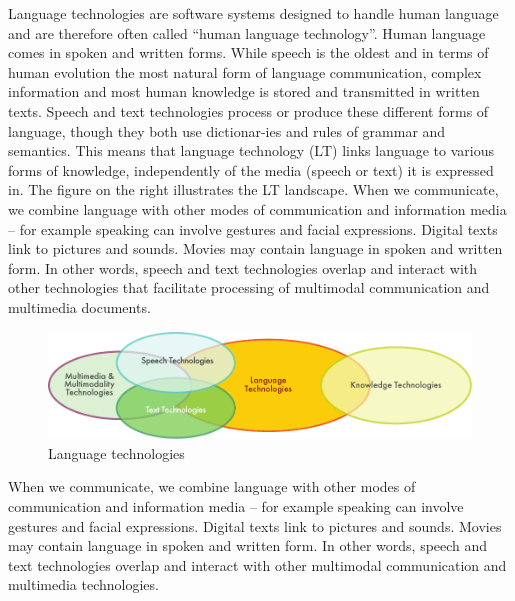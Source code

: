 \clearpage


\begin{multicols}{2}

Language technologies are software systems designed to handle human language and are therefore often called “human language technology”. Human language comes in spoken and written forms. While speech is the oldest and in terms of human evolution the most natural form of language communication, complex information and most human knowledge is stored and transmitted in written texts. Speech and text technologies process or produce these different forms of language, though they both use dictionar-ies and rules of grammar and semantics. This means that language technology (LT) links language to various forms of knowledge, independently of the media (speech or text) it is expressed in. The figure on the right illustrates the LT landscape. When we communicate, we combine language with other modes of communication and information media -- for example speaking can involve gestures and facial expressions. Digital texts link to pictures and sounds. Movies may contain language in spoken and written form. In other words, speech and text technologies overlap and interact with other technologies that facilitate processing of multimodal communication and multimedia documents. 

\begin{figure}[htb]
  \center
  \includegraphics[width=\textwidth]{../_media/english/language_technologies}
  \caption{Language technologies}
  \label{fig:ltincontext_en}
\end{figure}

When we communicate, we combine language with other modes of communication and information media -- for example speaking can involve gestures and facial expressions. Digital texts link to pictures and sounds. Movies may contain language in spoken and written form. In other words, speech and text technologies overlap and interact with other multimodal communication and multimedia technologies.


\end{multicols}
